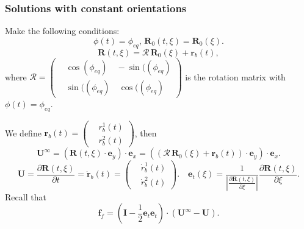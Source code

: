 \documentclass{beamer}
\begin{document}
\begin{frame}
	\frametitle{Solutions with constant orientations}
	\begin{overlayarea}{\textwidth}{\textheight}
	Make the following conditions:
	\begin{equation*}
		\label{eqn:39}
		\phi(t)=\phi_{eq},\, \textbf{R}_0(t,\xi)=\textbf{R}_0(\xi).
	\end{equation*}
	\begin{equation*}
		\label{eqn:40}
		\textbf{R}(t,\xi)=\mathbf{\mathcal{R}}\,\textbf{R}_0(\xi)+\textbf{r}_b(t),
	\end{equation*}
	\footnotesize where $\mathbf{\mathcal{R}}=\left(\begin{aligned}
		&\cos(\phi_{eq})\quad -\sin((\phi_{eq}) \\
		&\sin((\phi_{eq})\quad \cos((\phi_{eq})
	\end{aligned}\right) $ is the rotation matrix with $\phi(t)=\phi_{eq}$.
	
	We define $\textbf{r}_b(t)=\left(\begin{aligned}
		&r_b^{1}(t) \\
		&r_b^{2}(t)
	\end{aligned}\right)$, then 
	\begin{equation*}
		\label{eqn:41}
		\textbf{U}^{\infty}=\left(\textbf{R}(t,\xi)\cdot\textbf{e}_y\right)\cdot\textbf{e}_x=\left((\mathbf{\mathcal{R}}\,\textbf{R}_0(\xi)+\textbf{r}_b(t))\cdot\textbf{e}_y\right)\cdot\textbf{e}_x.
	\end{equation*}
	\begin{equation*}
		\label{eqn:42}
		\textbf{U}=\frac{\partial\textbf{R}(t,\xi)}{\partial t}=\dot{\textbf{r}}_b(t)=\left(\begin{aligned}
			&\dot{r}_b^{1}(t) \\
			&\dot{r}_b^{2}(t)
		\end{aligned}\right).\quad 	\textbf{e}_t(\xi)=\frac{1}{|\frac{\partial\textbf{R}(t,\xi)}{\partial\xi}|}\frac{\partial\textbf{R}(t,\xi)}{\partial\xi}.
	\end{equation*}
Recall that
	\begin{equation*}
		\label{eqn:44}
		\textbf{f}_{f}=\left(\mathbf{I}-\frac{1}{2}\textbf{e}_t\textbf{e}_t\right)\cdot(\textbf{U}^{\infty}-\textbf{U}).
	\end{equation*}
	\end{overlayarea}
\end{frame}

\end{document}
